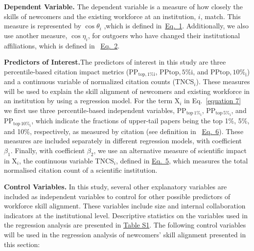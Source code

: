 \documentclass[draft,final]{vutinfth} %
\begin{document}
\textbf{Dependent Variable.} The dependent variable  is a measure of how closely the skills of newcomers and the existing workforce at an institution, $i$, match. This measure is represented by $\cos{\theta}_i$ ,which is defined in~\hyperref[Definition of skills section]{Eq.~1}.  Additionally, we also use another measure, $\cos{\eta}_i$, for outgoers who have changed their institutional affiliations, which is defined in ~\hyperref[Definition of skills section]{Eq.~2}.  

\textbf{Predictors of Interest.}The predictors of interest in this study are three percentile-based citation impact metrics (PP$_\mathrm{top,1\%i}$, PP$\mathrm{top,5\%i}$, and PP$\mathrm{top,10\%_i}$) and a continuous variable of normalized citation counts (TNCS$_i$). These measures will be used to explain the skill alignment of newcomers and existing workforce in an institution by using a regression model. For the term X$_i$ in Eq.~\ref{equation 7} we first use three percentile-based independent variables, PP$_\mathrm{top\,1\%_i}$, PP$_\mathrm{top\,5\%_i}$, and PP$_\mathrm{top\,10\%_i}$, which indicate the fractions of upper-tail papers being the top 1\%, 5\%, and 10\%, respectively, as measured by citation (see definition in ~\hyperref[Definition of skills section]{Eq.~6}). These measures are included separately in different regression models, with coefficient $\beta_1$. Finally, with coefficient $\beta_2$, we use an alternative measure of scientific impact in X$_i$, the continuous variable TNCS$_{i}$, defined in \hyperref[Definition of skills section]{Eq.~5}, which measures the total normalised citation count of a scientific institution.

\textbf{Control Variables.} In this study, several other explanatory variables are included as independent variables to control for other possible predictors of workforce skill alignment. These variables include size and internal collaboration indicators at the institutional level. Descriptive statistics on the variables used in the regression analysis are presented in \hyperref[Table S1]{Table S1}. The following control variables will be used in the regression analysis of newcomers' skill alignment presented in this section:

\newcommand\textequal{%
 \rule[.4ex]{4pt}{0.4pt}\llap{\rule[.7ex]{4pt}{0.4pt}}}
\end{document}
